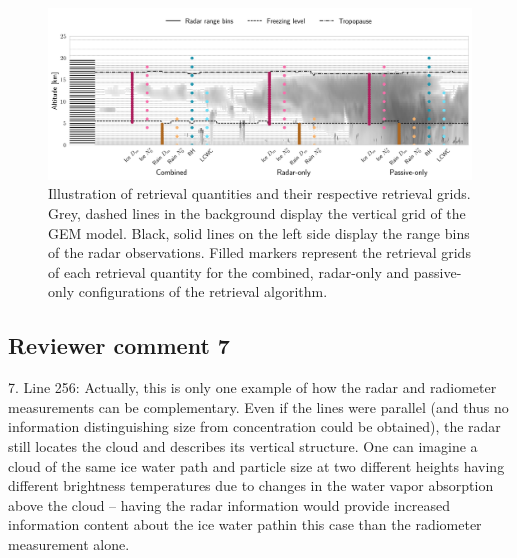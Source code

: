 \begin{figure}
\centering \includegraphics[width = 1.0\linewidth]{../plots/retrieval_sketch}
\caption{Illustration of retrieval quantities and their respective retrieval
  grids. Grey, dashed lines in the background display the vertical grid of the
  GEM model. Black, solid lines on the left side display the range bins of the
  radar observations. Filled markers represent the retrieval grids of each
  retrieval quantity for the combined, radar-only and passive-only
  configurations of the retrieval algorithm.}
\label{fig:retrieval_sketch}
\end{figure}




\subsection*{Reviewer comment 7}

7. Line 256: Actually, this is only one example of how the radar and radiometer
measurements can be complementary. Even if the lines were parallel (and thus no
information distinguishing size from concentration could be obtained), the radar
still locates the cloud and describes its vertical structure. One can imagine a
cloud of the same ice water path and particle size at two different heights
having different brightness temperatures due to changes in the water vapor
absorption above the cloud – having the radar information would provide
increased information content about the ice water pathin this case than the
radiometer measurement alone.

